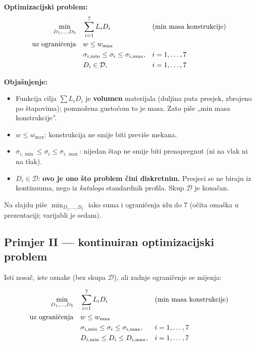 \textbf{Optimizacijski problem:}
\begin{equation}
\begin{aligned}
\min_{D_1,\dots,D_5} \quad & \sum_{i=1}^{7} L_i D_i
  && \text{(min masa konstrukcije)} \\
\uzogr & w \le w_{\max} \\
& \sigma_{i,\min} \le \sigma_i \le \sigma_{i,\max}, && i = 1,\dots,7 \\
& D_i \in \mathcal{D}, && i = 1,\dots,7
\end{aligned}
\end{equation}

\textbf{Objašnjenje:}
\begin{itemize}
  \item Funkcija cilja $\sum L_i D_i$ je \textbf{volumen} materijala (duljina
        puta presjek, zbrojeno po štapovima); pomnožena gustoćom to je masa. Zato
        piše „min masa konstrukcije”.
  \item $w \le w_{\max}$: konstrukcija ne smije biti previše mekana.
  \item $\sigma_{i,\min} \le \sigma_i \le \sigma_{i,\max}$: nijedan štap ne
        smije biti prenapregnut (ni na vlak ni na tlak).
  \item $D_i \in \mathcal{D}$: \textbf{ovo je ono što problem čini diskretnim.}
        Presjeci se ne biraju iz kontinuuma, nego iz \emph{kataloga} standardnih
        profila. Skup $\mathcal{D}$ je konačan.
\end{itemize}

\begin{napomena}
Na slajdu piše $\min_{D_1,\dots,D_5}$ iako suma i ograničenja idu do $7$
(očita omaška u prezentaciji; varijabli je sedam).
\end{napomena}

\subsection{Primjer II --- kontinuiran optimizacijski problem}

Isti nosač, iste oznake (bez skupa $\mathcal{D}$), ali zadnje ograničenje se
mijenja:

\begin{equation}
\begin{aligned}
\min_{D_1,\dots,D_5} \quad & \sum_{i=1}^{7} L_i D_i
  && \text{(min masa konstrukcije)} \\
\uzogr & w \le w_{\max} \\
& \sigma_{i,\min} \le \sigma_i \le \sigma_{i,\max}, && i = 1,\dots,7 \\
& D_{i,\min} \le D_i \le D_{i,\max}, && i = 1,\dots,7
\end{aligned}
\end{equation}

